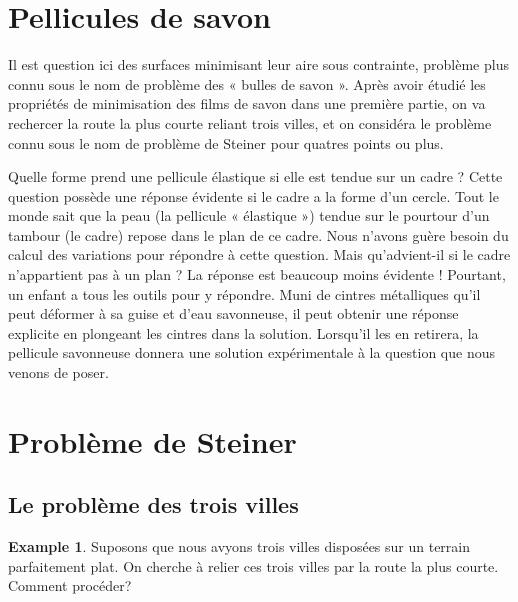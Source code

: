 \documentclass[10pt,a4paper]{article}%
\theoremstyle{theorem}
\theoremstyle{definition}
\newtheorem{example}{Example}
\begin{document}
		
	\section{Pellicules de savon}
	Il est question ici des surfaces minimisant leur aire sous contrainte, problème plus connu sous le nom de problème des « bulles de savon ». Après avoir étudié les propriétés de minimisation des films de savon dans une première partie, on va rechercer la route la plus courte reliant trois villes, et on considéra le problème connu sous le nom de problème de Steiner pour quatres points ou plus.
		
	Quelle forme prend une pellicule  élastique si elle est tendue sur un cadre ? Cette
	question possède une réponse  évidente si le cadre a la forme d’un cercle. Tout le monde
	sait que la peau (la pellicule « élastique ») tendue sur le pourtour d’un tambour (le cadre)
	repose dans le plan de ce cadre. Nous n’avons guère besoin du calcul des variations pour
	répondre à cette question. Mais qu’advient-il si le cadre n’appartient pas à un plan ?
	La réponse est beaucoup moins  évidente ! Pourtant, un enfant a tous les outils pour y
	répondre. Muni de cintres métalliques qu’il peut déformer à sa guise et d’eau savonneuse,
	il peut obtenir une réponse explicite en plongeant les cintres dans la solution. Lorsqu’il
	les en retirera, la pellicule savonneuse donnera une solution expérimentale à la question
	que nous venons de poser.
		
	\section{Problème de Steiner}
		\subsection{Le problème des trois villes}
		
		\begin{example}
			 Suposons que nous avyons trois villes disposées sur un terrain parfaitement plat. On cherche à relier ces trois villes par la route la plus courte. Comment procéder?
		\end{example}
		
\end{document}

